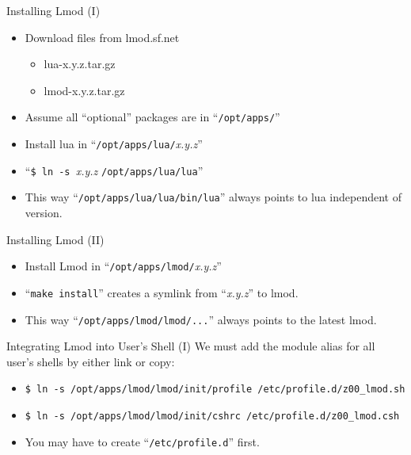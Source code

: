 \documentclass{beamer}
\begin{document}
\begin{frame}{Installing Lmod (I)}
  \begin{itemize}
    \item Download files from lmod.sf.net
      \begin{itemize}
        \item lua-x.y.z.tar.gz
        \item lmod-x.y.z.tar.gz
      \end{itemize}
    \item Assume all ``optional'' packages are in ``\texttt{/opt/apps/}''
    \item Install lua in ``\texttt{/opt/apps/lua/}\emph{x.y.z}''
    \item ``\texttt{\$ ln -s }\emph{x.y.z} \texttt{/opt/apps/lua/lua}''
    \item This way ``\texttt{/opt/apps/lua/lua/bin/lua}'' always points to
      lua independent of version.
  \end{itemize}
\end{frame}

\begin{frame}{Installing Lmod (II)}
  \begin{itemize}
    \item Install Lmod in ``\texttt{/opt/apps/lmod/}\emph{x.y.z}''
    \item ``\texttt{make install}'' creates a symlink from
      ``\emph{x.y.z}'' to lmod.
    \item This way ``\texttt{/opt/apps/lmod/lmod/...}'' always points
      to the latest lmod.
  \end{itemize}
\end{frame}

\begin{frame}{Integrating Lmod into User's Shell (I)}
    We must add the module alias for all user's shells by either link
    or copy:
    \begin{itemize}
      \item \texttt{\$ ln -s /opt/apps/lmod/lmod/init/profile /etc/profile.d/z00\_lmod.sh}
      \item \texttt{\$ ln -s /opt/apps/lmod/lmod/init/cshrc   /etc/profile.d/z00\_lmod.csh}
      \item You may have to create ``\texttt{/etc/profile.d}'' first.
  \end{itemize}
\end{frame}
\end{document}
